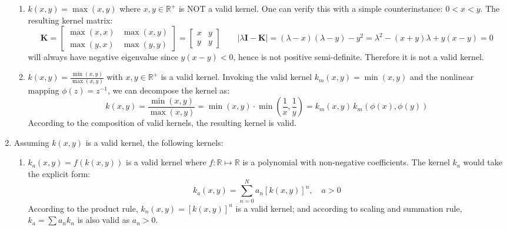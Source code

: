 \documentclass[a4paper, 10pt]{article}
\begin{document}
\begin{enumerate}[label=(\alph*)]
\begin{enumerate}[label=(\arabic*)]
        \item $k(x,y) = \max(x, y)$ where $x,y\in \mathbb{R}^+$ is NOT a valid kernel. One can verify this with a simple counterinstance: $0 < x < y$. The resulting kernel matrix:
        \begin{equation}
            \mathbf{K} = \begin{bmatrix}
                \max (x,x) & \max (x,y) \\ \max (y,x) & \max (y, y)
            \end{bmatrix} = \begin{bmatrix}
                x & y \\ y & y
            \end{bmatrix}\qquad 
            |\lambda \mathbf{I} - \mathbf{K}| = (\lambda-x)(\lambda-y) - y^2 = \lambda^2 - (x+y) \lambda + y(x-y) = 0
        \end{equation}
        will always have negative eigenvalue since $y(x-y) < 0$, hence is not positive semi-definite. Therefore it is not a valid kernel.
        
        \item $k(x,y) = \frac{\min(x,y)}{\max(x,y)}$ with $x,y\in \mathbb{R}^+$ is a valid kernel. Invoking the valid kernel $k_m(x,y) = \min(x,y)$ and the nonlinear mapping $\phi(z) = z^{-1}$, we can decompose the kernel as:
        \begin{equation}
            k(x,y) = \frac{\min (x,y)}{\max (x,y)} = \min(x,y) \cdot \min \left(\frac{1}{x}, \frac{1}{y}\right) = k_m(x,y) \, k_m\left(\phi(x), \phi(y)\right)
        \end{equation}
        According to the composition of valid kernels, the resulting kernel is valid.
        
    \end{enumerate}
    
    \item Assuming $k(x,y)$ is a valid kernel, the following kernels:
    \begin{enumerate}
        \item $k_a(x,y) = f(k(x,y))$ is a valid kernel where $f: \mathbb{R} \mapsto \mathbb{R}$ is a polynomial with non-negative coefficients. The kernel $k_a$ would take the explicit form:
        \begin{equation}
            k_a(x, y) = \sum_{n=0}^N a_n \left[k(x,y)\right]^n,\quad a > 0
        \end{equation}
        According to the product rule, $k_n(x,y) = \left[k(x,y)\right]^n$ is a valid kernel; and according to scaling and summation rule, $k_a = \sum a_n k_n$ is also valid as $a_n > 0$.
        

\end{enumerate}
\end{enumerate}
\end{document}
